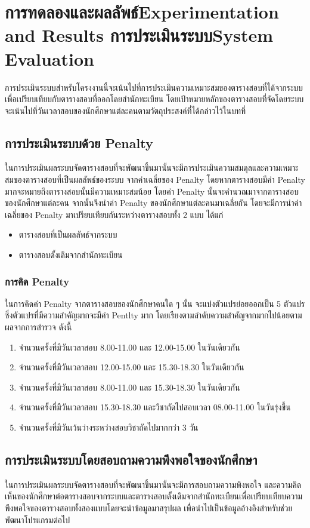 \chapter{\ifproject%
\ifcpe การทดลองและผลลัพธ์\else Experimentation and Results\fi
\else%
\ifcpe การประเมินระบบ\else System Evaluation\fi
\fi}

การประเมินระบบสำหรับโครงงานนี้จะเน้นไปที่การประเมินความเหมาะสมของตารางสอบที่ได้จากระบบ
\linebreak
เพื่อเปรียบเทียบกับตารางสอบที่ออกโดยสำนักทะเบียน 
โดยเป้าหมายหลักของตารางสอบที่จัดโดยระบบจะเน้นไปที่วันเวลาสอบของนักศึกษาแต่ละคนตามวัตถุประสงค์ที่ได้กล่าวไว้ในบทที่ 

\section{การประเมินระบบด้วย Penalty}
ในการประเมินผลระบบจัดตารางสอบที่จะพัฒนาขึ้นมานั้นจะมีการประเมินความสมดุลและความเหมาะสมของตารางสอบที่เป็นผลลัพธ์ของระบบ จากค่าเฉลี่ยของ Penalty 
โดยหากตารางสอบมีค่า Penalty มากจะหมายถึงตารางสอบนั้นมีความเหมาะสมน้อย โดยค่า Penalty นั้นจะคำนวณมาจากตารางสอบของนักศึกษาแต่ละคน
จากนั้นจึงนำค่า Penalty ของนักศึกษาแต่ละคนมาเฉลี่ยกัน 
โดยจะมีการนำค่าเฉลี่ยของ Penalty มาเปรียบเทียบกันระหว่างตารางสอบทั้ง 2 แบบ
ได้แก่
\begin{itemize}
    \item ตารางสอบที่เป็นผลลัพธ์จากระบบ
    \item ตารางสอบดั้งเดิมจากสำนักทะเบียน
\end{itemize}

\subsection{การคิด Penalty}
ในการคิดค่า Penalty จากตารางสอบของนักศึกษาคนใด ๆ นั้น จะแบ่งตัวแปรย่อยออกเป็น 5 ตัวแปร 
ซึ่งตัวแปรที่มีความสำคัญมากจะมีค่า Pentlty มาก โดยเรียงตามลำดับความสำคัญจากมากไปน้อยตามผลจากการสำรวจ ดังนี้
\begin{enumerate}
    \item จำนวนครั้งที่มีวันเวลาสอบ 8.00-11.00 และ 12.00-15.00 ในวันเดียวกัน
    \item จำนวนครั้งที่มีวันเวลาสอบ 12.00-15.00 และ 15.30-18.30 ในวันเดียวกัน
    \item จำนวนครั้งที่มีวันเวลาสอบ 8.00-11.00 และ 15.30-18.30 ในวันเดียวกัน
    \item จำนวนครั้งที่มีวันเวลาสอบ 15.30-18.30 และวิชาถัดไปสอบเวลา 08.00-11.00 ในวันรุ่งขึ้น
    \item จำนวนครั้งที่มีวันเว้นว่างระหว่างสอบวิชาถัดไปมากกว่า 3 วัน
\end{enumerate}

\section{การประเมินระบบโดยสอบถามความพึงพอใจของนักศึกษา}
ในการประเมินผลระบบจัดตารางสอบที่จะพัฒนาขึ้นมานั้นจะมีการสอบถามความพึงพอใจ
และความคิดเห็นของนักศึกษาต่อตารางสอบจากระบบและตารางสอบดั้งเดิมจากสำนักทะเบียนเพื่อเปรียบเทียบความพึงพอใจของตารางสอบทั้งสองแบบโดยจะนำข้อมูลมาสรุปผล เพื่อนำไปเป็นข้อมูลอ้างอิงสำหรับช่วย
พัฒนาโปรแกรมต่อไป